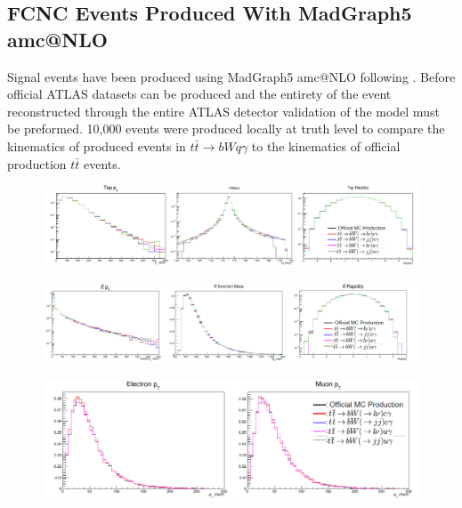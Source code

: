 \subsection{FCNC Events Produced With MadGraph5 amc@NLO}

Signal events have been produced using MadGraph5 amc@NLO following \cite{Degrande:2014tta}.  Before official ATLAS datasets can be produced and the entirety of the event reconstructed through the entire ATLAS detector validation of the model must be preformed.  10,000 events were produced locally at truth level to compare the kinematics of produced events in $t\bar{t}\rightarrow bWq\gamma$ to the kinematics of official production $t\bar{t}$ events. 

\begin{figure}[h!]
	\centering
	\includegraphics[width=\columnwidth]{../ThesisImages/FCNCValidation/singleTops.png}
	\caption{
	}
\end{figure}

\begin{figure}[h!]
	\centering
	\includegraphics[width=\columnwidth]{../ThesisImages/FCNCValidation/ttBarSys.png}
	\caption{
	}
\end{figure}

\begin{figure}[h!]
	\centering
	\includegraphics[width=\columnwidth]{../ThesisImages/FCNCValidation/lepton.png}
	\caption{
	}
\end{figure} 

